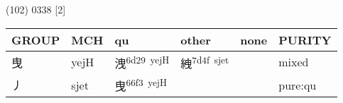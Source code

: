 \documentclass[14pt,a4paper]{scrartcl}
\begin{document}
(102) 0338 {[}2{]}

\begin{longtable}[c]{@{}llllll@{}}
\toprule
\begin{minipage}[b]{0.14\columnwidth}\raggedright\strut
GROUP
\strut\end{minipage} &
\begin{minipage}[b]{0.14\columnwidth}\raggedright\strut
MCH
\strut\end{minipage} &
\begin{minipage}[b]{0.14\columnwidth}\raggedright\strut
qu
\strut\end{minipage} &
\begin{minipage}[b]{0.14\columnwidth}\raggedright\strut
other
\strut\end{minipage} &
\begin{minipage}[b]{0.14\columnwidth}\raggedright\strut
none
\strut\end{minipage} &
\begin{minipage}[b]{0.14\columnwidth}\raggedright\strut
PURITY
\strut\end{minipage}\tabularnewline
\midrule
\endhead
\begin{minipage}[t]{0.14\columnwidth}\raggedright\strut
曳
\strut\end{minipage} &
\begin{minipage}[t]{0.14\columnwidth}\raggedright\strut
yejH
\strut\end{minipage} &
\begin{minipage}[t]{0.14\columnwidth}\raggedright\strut
洩\textsuperscript{6d29~yejH}
\strut\end{minipage} &
\begin{minipage}[t]{0.14\columnwidth}\raggedright\strut
絏\textsuperscript{7d4f~sjet}
\strut\end{minipage} &
\begin{minipage}[t]{0.14\columnwidth}\raggedright\strut
\strut\end{minipage} &
\begin{minipage}[t]{0.14\columnwidth}\raggedright\strut
mixed
\strut\end{minipage}\tabularnewline
\begin{minipage}[t]{0.14\columnwidth}\raggedright\strut
丿
\strut\end{minipage} &
\begin{minipage}[t]{0.14\columnwidth}\raggedright\strut
sjet
\strut\end{minipage} &
\begin{minipage}[t]{0.14\columnwidth}\raggedright\strut
曳\textsuperscript{66f3~yejH}
\strut\end{minipage} &
\begin{minipage}[t]{0.14\columnwidth}\raggedright\strut
\strut\end{minipage} &
\begin{minipage}[t]{0.14\columnwidth}\raggedright\strut
\strut\end{minipage} &
\begin{minipage}[t]{0.14\columnwidth}\raggedright\strut
pure:qu
\strut\end{minipage}\tabularnewline
\bottomrule
\end{longtable}
\end{document}
